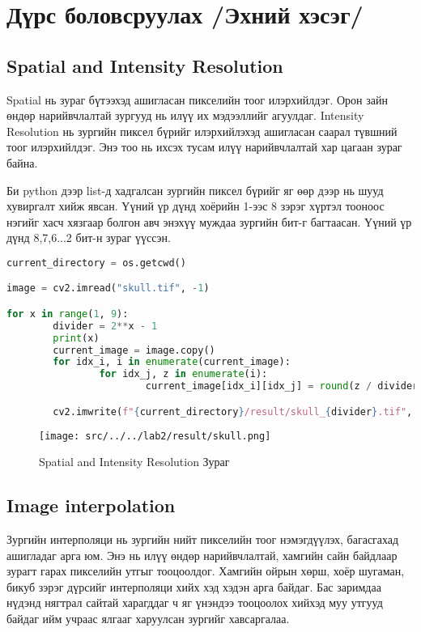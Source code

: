 \chapter{Дүрс боловсруулах /Эхний хэсэг/}
\section{Spatial and Intensity Resolution}

Spatial нь зураг бүтээхэд ашигласан пикселийн тоог илэрхийлдэг. Орон зайн өндөр нарийвчлалтай зургууд нь илүү их мэдээллийг агуулдаг. Intensity Resolution нь зургийн пиксел бүрийг илэрхийлэхэд ашигласан саарал түвшний тоог илэрхийлдэг. Энэ тоо нь ихсэх тусам илүү нарийвчлалтай хар цагаан зураг байна.

Би python дээр list-д хадгалсан зургийн пиксел бүрийг яг өөр дээр нь шууд хувиргалт хийж явсан. Үүний үр дүнд хоёрийн 1-ээс 8 зэрэг хүртэл тооноос нэгийг хасч хязгаар болгон авч энэхүү муждаа зургийн бит-г багтаасан. Үүний үр дүнд 8,7,6...2 бит-н зураг үүссэн.

\begin{lstlisting}[language=Python, caption=Spatial and Intensity Resolution, frame=single]
current_directory = os.getcwd()

image = cv2.imread("skull.tif", -1)

for x in range(1, 9):
		divider = 2**x - 1
		print(x)
		current_image = image.copy()
		for idx_i, i in enumerate(current_image):
				for idx_j, z in enumerate(i):
						current_image[idx_i][idx_j] = round(z / divider) * divider

		cv2.imwrite(f"{current_directory}/result/skull_{divider}.tif", current_image)
\end{lstlisting}

\begin{figure}[h!]
	\centering
	\texttt{[image: src/../../lab2/result/skull.png]}
	\caption{Spatial and Intensity Resolution Зураг}
\end{figure}

\pagebreak

\section{Image interpolation}

Зургийн интерполяци нь зургийн нийт пикселийн тоог нэмэгдүүлэх, багасгахад ашигладаг арга юм. Энэ нь илүү өндөр нарийвчлалтай, хамгийн сайн байдлаар зурагт гарах пикселийн утгыг тооцоолдог. Хамгийн ойрын хөрш, хоёр шугаман, бикуб зэрэг дүрсийг интерполяци хийх хэд хэдэн арга байдаг.
Бас заримдаа нүдэнд нягтрал сайтай харагддаг ч яг үнэндээ тооцоолох хийхэд муу утгууд байдаг ийм учраас ялгааг харуулсан зургийг хавсаргалаа.
